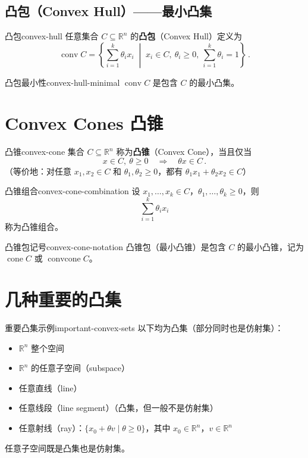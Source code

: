 \documentclass[11pt,a4paper]{article}
\begin{document}
\subsection{凸包（Convex Hull）——最小凸集}
\begin{definition}{凸包}{convex-hull}
任意集合 $C \subseteq \mathbb{R}^n$ 的\textbf{凸包}（Convex Hull）定义为
\[
\operatorname{conv} C = \left\{ \sum_{i=1}^k \theta_i x_i \;\middle|\; x_i \in C,\ \theta_i \geq 0,\ \sum_{i=1}^k \theta_i = 1 \right\}\,.
\]
\end{definition}

\begin{theorem}{凸包最小性}{convex-hull-minimal}
$\operatorname{conv} C$ 是包含 $C$ 的最小凸集。
\end{theorem}

\section{Convex Cones 凸锥}\label{sec:ch2-cone}

\begin{definition}{凸锥}{convex-cone}
集合 $C \subseteq \mathbb{R}^n$ 称为\textbf{凸锥}（Convex Cone），当且仅当
\[
x \in C,\ \theta \geq 0 \quad \Longrightarrow \quad \theta x \in C\,.
\]
（等价地：对任意 $x_1, x_2 \in C$ 和 $\theta_1, \theta_2 \geq 0$，都有 $\theta_1 x_1 + \theta_2 x_2 \in C$）
\end{definition}

\begin{definition}{凸锥组合}{convex-cone-combination}
设 $x_1,\dots,x_k \in C$，$\theta_1,\dots,\theta_k \geq 0$，则
\[
\sum_{i=1}^k \theta_i x_i
\]
称为凸锥组合。
\end{definition}

\begin{remark}{凸锥包记号}{convex-cone-notation}
凸锥包（最小凸锥）是包含 $C$ 的最小凸锥，记为 $\operatorname{cone} C$ 或 $\operatorname{convcone} C$。
\end{remark}

\section{几种重要的凸集}

\begin{definition}{重要凸集示例}{important-convex-sets}
以下均为凸集（部分同时也是仿射集）：
\begin{itemize}[leftmargin=*, itemsep=0.5em]
\item $\mathbb{R}^n$ 整个空间
\item $\mathbb{R}^n$ 的任意子空间（subspace）
\item 任意直线（line）
\item 任意线段（line segment）（凸集，但一般不是仿射集）
\item 任意射线（ray）：$\{x_0 + \theta v \mid \theta \geq 0\}$，其中 $x_0 \in \mathbb{R}^n$，$v \in \mathbb{R}^n$
\end{itemize}
任意子空间既是凸集也是仿射集。
\end{definition}
\end{document}
